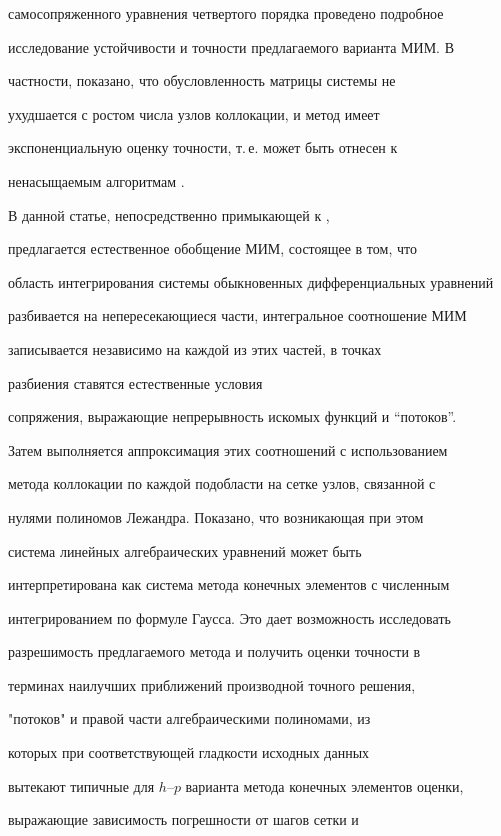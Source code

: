 самосопряженного уравнения четвертого порядка проведено подробное


исследование устойчивости и точности предлагаемого варианта МИМ. В


частности, показано, что обусловленность матрицы системы не


ухудшается с ростом числа узлов коллокации, и метод имеет


экспоненциальную оценку точности, т.\,е. может быть отнесен к


ненасыщаемым алгоритмам \cite{Babenko}.





В данной статье, непосредственно примыкающей к \cite{DautPaim},


предлагается естественное обобщение МИМ, состоящее в том, что


область интегрирования системы обыкновенных дифференциальных уравнений


разбивается на непересекающиеся части, интегральное соотношение МИМ


записывается независимо на каждой из этих частей, в точках


разбиения ставятся естественные условия


сопряжения, выражающие непрерывность искомых функций и ``потоков''.


Затем выполняется аппроксимация этих соотношений с использованием


метода коллокации по каждой подобласти на сетке узлов, связанной с


нулями полиномов Лежандра. Показано, что возникающая при этом


система линейных алгебраических уравнений может быть


интерпретирована как система метода конечных элементов с численным


интегрированием по формуле Гаусса. Это дает возможность исследовать


разрешимость предлагаемого метода и получить оценки точности в


терминах наилучших приближений производной точного решения,


"потоков" и правой части алгебраическими полиномами, из


которых при соответствующей гладкости исходных данных


вытекают типичные для $h$--$p$ варианта метода конечных элементов оценки,


выражающие зависимость погрешности от шагов сетки и


